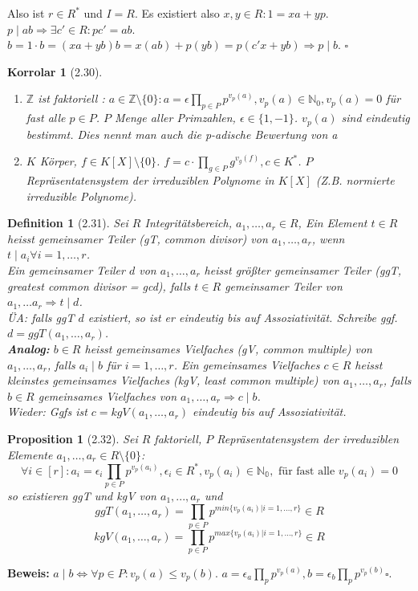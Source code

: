 \documentclass[10pt,a4paper]{article}
\newtheorem{defi}{Definition}
\newtheorem{korr}{Korrolar}
\newtheorem{prop}{Proposition}
\begin{document}
Also ist $r \in R^*$ und $I = R$. Es existiert also $x,y \in R : 1 = xa + yp$.\\
$p \mid ab \Rightarrow \exists c' \in R : pc' = ab$.\\
$b = 1 \cdot b = (xa + yb) b = x(ab) + p (yb) = p (c'x + yb) \Rightarrow p \mid b$. $\square$\\
\begin{korr}[2.30]
 \begin{enumerate}
  \item $\mathbb{Z}$ ist faktoriell : $a \in \mathbb{Z} \setminus \lbrace 0 \rbrace : a = \epsilon \prod_{p\in P} p^{v_p(a)}, v_p(a) \in \mathbb{N}_0, v_p(a) = 0$ für fast alle $p\in P$. $P$ Menge aller Primzahlen, $\epsilon \in \lbrace 1,-1\rbrace$. $v_p(a)$ sind eindeutig bestimmt. Dies nennt man auch die \glqq p-adische Bewertung von a\grqq 
  \item $K$ Körper, $f \in K[X] \setminus \lbrace 0\rbrace $. $f = c \cdot \prod_{g \in P} g^{v_g(f)}, c \in K^*$. $P$ Repräsentatensystem der irreduziblen Polynome in $K[X]$ (Z.B. normierte irreduzible Polynome).
 \end{enumerate}
\end{korr}

\begin{defi}[2.31]
 Sei $R$ Integritätsbereich, $a_1, \dots, a_r \in R$, Ein Element $t\in R$ heisst \emph{gemeinsamer Teiler} (gT, common divisor) von $a_1, \dots, a_r$, wenn $t\mid a_i \forall i = 1,\dots,r$.\\
 Ein gemeinsamer Teiler $d$ von $a_1, \dots, a_r$ heisst \emph{größter gemeinsamer Teiler} (ggT, greatest common divisor = gcd), falls $t \in R $ gemeinsamer Teiler von $a_1, \dots a_r \Rightarrow t\mid d$.\\
 ÜA: \emph{falls} ggT $d$ existiert, so ist er eindeutig bis auf Assoziativität. Schreibe ggf. $d = ggT (a_1, \dots, a_r)$.\\
 \textbf{Analog:} $b \in R$ heisst \emph{gemeinsames Vielfaches} (gV, common multiple) von $a_1,\dots,a_r$, falls $a_i \mid b$ für $i = 1,\dots ,r$. Ein gemeinsames Vielfaches $c \in R$ heisst \emph{kleinstes gemeinsames Vielfaches} (kgV, least common multiple) von $a_1, \dots, a_r$, falls $b \in R$ gemeinsames Vielfaches von $a_1, \dots, a_r \Rightarrow c \mid b$.\\
 Wieder: Ggfs ist $c = kgV(a_1,\dots, a_r)$ eindeutig bis auf Assoziativität.
\end{defi}
\begin{prop}[2.32]
 Sei $R$ faktoriell, $P$ Repräsentatensystem der irreduziblen Elemente $a_1,\dots, a_r \in R\setminus \lbrace 0 \rbrace$:
 $$\forall i \in [r] : a_i = \epsilon_i \prod_{p\in P} p^{v_p(a_i)}, \epsilon_i \in R^*, v_p(a_i) \in \mathbb{N_0}, \textrm{ für fast alle } v_p(a_i) = 0$$
 so existieren ggT und kgV von $a_1,...,a_r$ und 
 $$ggT(a_1,\dots,a_r) = \prod_{p\in P} p^{min\lbrace v_p(a_i) | i = 1, \dots, r\rbrace} \in R$$
 $$kgV(a_1,\dots,a_r) = \prod_{p\in P} p^{max\lbrace v_p(a_i) | i = 1, \dots, r\rbrace} \in R$$
\end{prop}
\textbf{Beweis:} $a \mid b \Leftrightarrow \forall p\in P : v_p(a) \le v_p(b)$. $a = \epsilon_a \prod_{p} p^{v_p(a)}, b = \epsilon_b \prod_p p^{v_p(b)} \square$.
\end{document}
